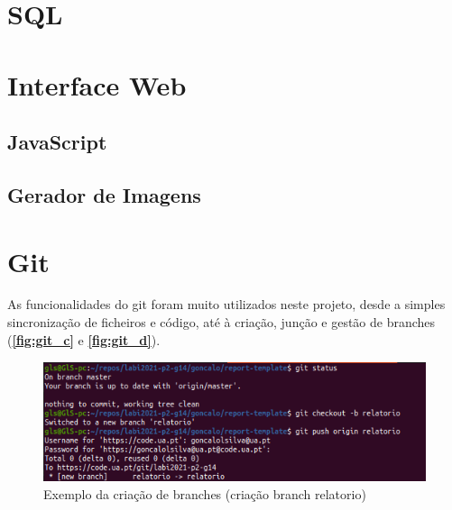 \documentclass{report}
\begin{document}
\section{SQL}
\label{sec:sql}

\section{Interface Web}
\label{sec:interfaceWeb}

\subsection{JavaScript}
\label{ssec:JS}

\subsection{Gerador de Imagens}
\label{ssec:geradorImagens}

\section{Git}
\label{sec:git}
As funcionalidades do git foram muito utilizados neste projeto, desde a simples sincronização 
de ficheiros e código, até à criação, junção e gestão de branches (\textbf{\autoref{fig:git_c}} e 
\textbf{\autoref{fig:git_d}}). 
\cite{git}

\begin{figure}[!h]
\center 
\includegraphics[height=100pt]{img/git_1.png}
\caption{Exemplo da criação de branches (criação branch relatorio)}
\label{fig:git_c}
\end{figure}
\end{document}
